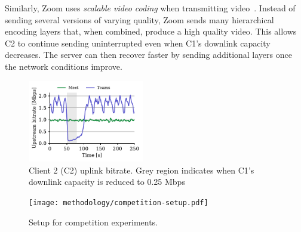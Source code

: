 Similarly, Zoom uses \textit{scalable video coding} when transmitting
video~\cite{zoom_encoding}. Instead of sending several versions of varying
quality, Zoom sends many hierarchical encoding layers that, when combined,
produce a high quality video. This allows C2 to continue sending uninterrupted
even when C1's downlink capacity decreases. The server can then recover faster
by sending additional layers once the network conditions improve.  


\begin{figure}[t]
    \centering
    \includegraphics[width=0.45\textwidth,keepaspectratio]{../figures/interrupt/Interrupt-sender.pdf}
    \caption{Client 2 (C2) uplink bitrate. Grey region indicates when C1's downlink capacity is reduced to 0.25 Mbps}
    \label{fig:interrupt-sender}
\end{figure}

\begin{figure}[]
   \centering
    \texttt{[image: methodology/competition-setup.pdf]}
    \caption{Setup for competition experiments.}
    \label{fig:competition-setup}
\end{figure}

